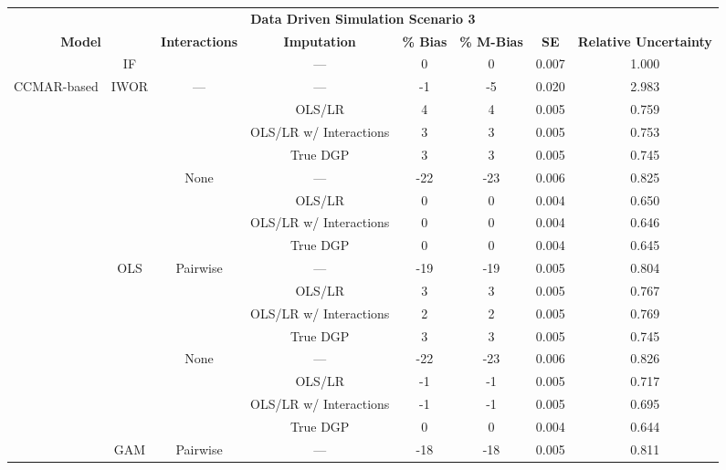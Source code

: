 \begin{table}
\centering
\begin{tabular}[ht]{|>{}c|c|c|c|c|c|c|>{}c|}
\hline
\multicolumn{8}{|c|}{\textbf{Data Driven Simulation Scenario 3}} \\
\cline{1-8}
\multicolumn{2}{|c|}{\textbf{Model}} & \textbf{Interactions} & \textbf{Imputation} & \textbf{\% Bias} & \textbf{\% M-Bias} & \textbf{SE} & \textbf{Relative Uncertainty}\\
\hline
 & IF &  & --- & 0 & 0 & 0.007 & 1.000\\
\cline{2-2}
\cline{4-8}
\multirow{-2}{*}{\centering\arraybackslash CCMAR-based} & IWOR & \multirow{-2}{*}{\centering\arraybackslash ---} & --- & -1 & -5 & 0.020 & 2.983\\
\cline{1-8}
 &  &  & OLS/LR & 4 & 4 & 0.005 & 0.759\\
\cline{4-8}
 &  &  & OLS/LR w/ Interactions & 3 & 3 & 0.005 & 0.753\\
\cline{4-8}
 &  &  & True DGP & 3 & 3 & 0.005 & 0.745\\
\cline{4-8}
 &  & \multirow{-4}{*}{\centering\arraybackslash None} & --- & -22 & -23 & 0.006 & 0.825\\
\cline{3-8}
 &  &  & OLS/LR & 0 & 0 & 0.004 & 0.650\\
\cline{4-8}
 &  &  & OLS/LR w/ Interactions & 0 & 0 & 0.004 & 0.646\\
\cline{4-8}
 &  &  & True DGP & 0 & 0 & 0.004 & 0.645\\
\cline{4-8}
 & \multirow{-8}{*}{\centering\arraybackslash OLS} & \multirow{-4}{*}{\centering\arraybackslash Pairwise} & --- & -19 & -19 & 0.005 & 0.804\\
\cline{2-8}
 &  &  & OLS/LR & 3 & 3 & 0.005 & 0.767\\
\cline{4-8}
 &  &  & OLS/LR w/ Interactions & 2 & 2 & 0.005 & 0.769\\
\cline{4-8}
 &  &  & True DGP & 3 & 3 & 0.005 & 0.745\\
\cline{4-8}
 &  & \multirow{-4}{*}{\centering\arraybackslash None} & --- & -22 & -23 & 0.006 & 0.826\\
\cline{3-8}
 &  &  & OLS/LR & -1 & -1 & 0.005 & 0.717\\
\cline{4-8}
 &  &  & OLS/LR w/ Interactions & -1 & -1 & 0.005 & 0.695\\
\cline{4-8}
 &  &  & True DGP & 0 & 0 & 0.004 & 0.644\\
\cline{4-8}
 & \multirow{-8}{*}{\centering\arraybackslash GAM} & \multirow{-4}{*}{\centering\arraybackslash Pairwise} & --- & -18 & -18 & 0.005 & 0.811\\

\end{tabular}
\end{table}
